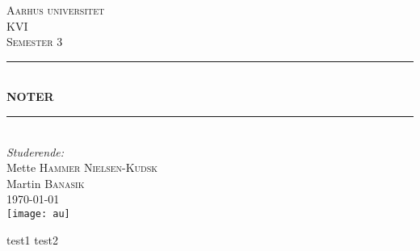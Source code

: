 \documentclass[12pt, letterpaper]{article}
\begin{document}
\begin{titlepage}

\newcommand{\HRule}{\rule{\linewidth}{0.5mm}} %

\center %
 

\textsc{\LARGE Aarhus universitet}\\[1.5cm] %
\textsc{\Large KVI}\\[0.5cm] %
\textsc{\large Semester 3}\\[0.5cm] %


\HRule \\[0.4cm]
{ \huge \bfseries NOTER}\\[0.4cm] %
\HRule \\[1.5cm]
 

\Large \emph{Studerende:}\\[1cm]
Mette \textsc{Hammer Nielsen-Kudsk}\\[0,5cm] %
Martin \textsc{Banasik}\\[1cm] %

{\large \today}\\[1,2cm] %


\texttt{[image: au]}\\ %
 

\vfill %


test1
test2

\end{titlepage}
\end{document}
